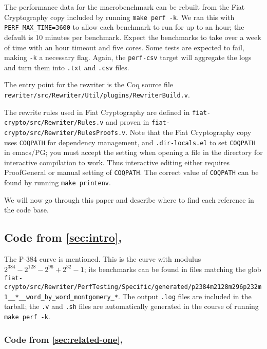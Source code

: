 \documentclass[a4paper,USenglish,cleveref,autoref,thm-restate]{lipics-v2021}
\begin{document}
The performance data for the macrobenchmark can be rebuilt from the Fiat Cryptography copy included by running \texttt{make perf -k}.
We ran this with \texttt{PERF\_MAX\_TIME=3600} to allow each benchmark to run for up to an hour; the default is 10 minutes per benchmark.
Expect the benchmarks to take over a week of time with an hour timeout and five cores.
Some tests are expected to fail, making \texttt{-k} a necessary flag.
Again, the \texttt{perf-csv} target will aggregate the logs and turn them into \texttt{.txt} and \texttt{.csv} files.

The entry point for the rewriter is the Coq source file \texttt{rewriter/src/Rewriter/Util/plugins/RewriterBuild.v}.

The rewrite rules used in Fiat Cryptography are defined in \texttt{fiat-crypto/src/Rewriter/Rules.v} and proven in \texttt{fiat-crypto/src/Rewriter/RulesProofs.v}.
Note that the Fiat Cryptography copy uses \verb|COQPATH| for dependency management, and \verb|.dir-locals.el| to set \verb|COQPATH| in emacs/PG; you must accept the setting when opening a file in the directory for interactive compilation to work.
Thus interactive editing either requires ProofGeneral or manual setting of \verb|COQPATH|.
The correct value of \verb|COQPATH| can be found by running \verb|make printenv|.

We will now go through this paper and describe where to find each reference in the code base.

\newcommand{\autocommanameref}[1]{\autoref{#1}, \nameref{#1}}

\subsection{Code from \autocommanameref{sec:intro}}

The P-384 curve is mentioned.
This is the curve with modulus $2^{384} - 2^{128} - 2^{96} + 2^{32} - 1$; its benchmarks can be found in files matching the glob \texttt{fiat-crypto/src/Rewriter/PerfTesting/Specific/generated/p2384m2128m296p232m1\_\_*\_\_word\_by\_word\_montgomery\_*}.
The output \texttt{.log} files are included in the tarball; the \texttt{.v} and \texttt{.sh} files are automatically generated in the course of running \texttt{make perf -k}.

\subsubsection{Code from \autocommanameref{sec:related-one}}
\end{document}
